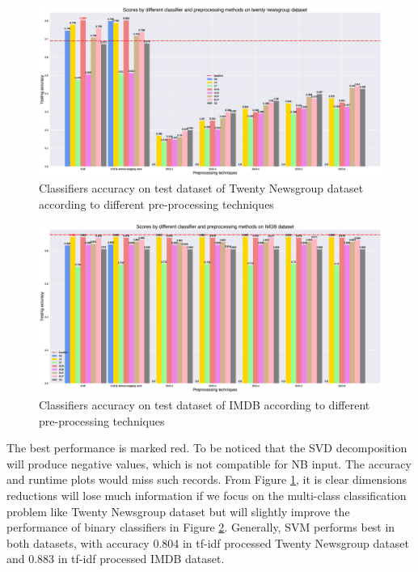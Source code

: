 \documentclass[11pt]{scrartcl}
\begin{document}
\begin{figure}[H]
	\centering
	\includegraphics[width=\linewidth]{fig/model_acc_20.eps}
	\caption{Classifiers accuracy on test dataset of Twenty Newsgroup dataset according to different pre-processing techniques}
	\label{accuracy_20}
\end{figure}

\begin{figure}[H]
	\centering
	\includegraphics[width=\linewidth]{fig/model_acc_imdb.eps}
	\caption{Classifiers accuracy on test dataset of IMDB according to different pre-processing techniques}
	\label{accuracy_imdb}
\end{figure}

The best performance is marked red. To be noticed that the SVD decomposition will produce negative values, which is not compatible for NB input. The accuracy and runtime plots would miss such records. From Figure \ref{accuracy_20}, it is clear dimensions reductions will lose much information if we focus on the multi-class classification problem like Twenty Newsgroup dataset but will slightly improve the performance of binary classifiers in Figure \ref{accuracy_imdb}. Generally, SVM performs best in both datasets, with accuracy 0.804 in tf-idf processed Twenty Newsgroup dataset and 0.883 in tf-idf processed IMDB dataset.
\end{document}
